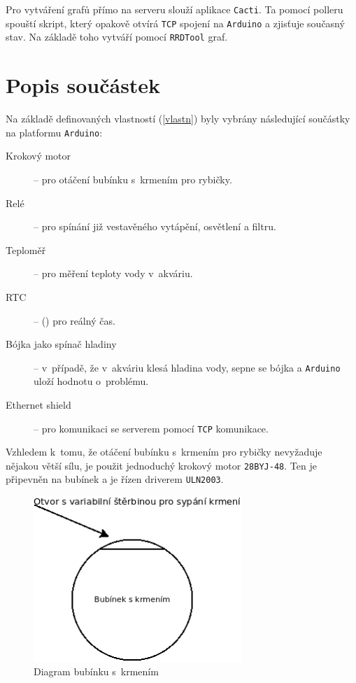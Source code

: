 \documentclass[a4paper,10pt]{article}
\newcommand{\ttt}[1]{\texttt{#1}}
\begin{document}
Pro vytváření grafů přímo na serveru slouží aplikace \texttt{Cacti}. Ta pomocí polleru spouští skript, který opakově otvírá \texttt{TCP} spojení na \texttt{Arduino} a zjisťuje současný stav. Na základě toho vytváří pomocí \texttt{RRDTool} graf.

\section{Popis součástek}

Na základě definovaných vlastností (\ref{vlastn}) byly vybrány následující součástky na platformu \ttt{Arduino}:

\begin{description}
	\item[Krokový motor] -- pro otáčení bubínku s~krmením pro rybičky.
	\item[Relé] -- pro spínání již vestavěného vytápění, osvětlení a filtru.
	\item[Teploměř] -- pro měření teploty vody v~akváriu.
	\item[RTC] -- () pro reálný čas.
	\item[Bójka jako spínač hladiny] -- v~případě, že v~akváriu klesá hladina vody, sepne se bójka a \ttt{Arduino} uloží hodnotu o~problému.
	\item[Ethernet shield] -- pro komunikaci se serverem pomocí \ttt{TCP} komunikace.
\end{description}

Vzhledem k~tomu, že otáčení bubínku s~krmením pro rybičky nevyžaduje nějakou větší sílu, je použit jednoduchý krokový motor \ttt{28BYJ-48}. Ten je připevněn na bubínek a je řízen driverem \ttt{ULN2003}. 

\begin{figure}[H]
  \centering
    \includegraphics[width=0.7\textwidth]{krmeni.png}
  \caption{Diagram bubínku s~krmením}
  \label{char:bub}
\end{figure}
\end{document}
